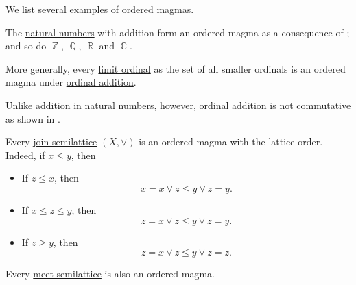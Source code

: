 \begin{example}\label{ex:def:ordered_magma}
  We list several examples of \hyperref[def:ordered_magma]{ordered magmas}.

  \begin{thmenum}
     The \hyperref[def:set_of_natural_numbers]{natural numbers} with addition form an ordered magma as a consequence of ; and so do \( \BbbZ \), \( \BbbQ \), \( \BbbR \) and \( \BbbC \).

     More generally, every \hyperref[def:successor_and_limit_ordinal]{limit ordinal} as the set of all smaller ordinals is an ordered magma under \hyperref[def:ordinal_arithmetic/addition]{ordinal addition}.

    Unlike addition in natural numbers, however, ordinal addition is not commutative as shown in .

     Every \hyperref[def:semilattice/join]{join-semilattice} \( (X, \vee) \) is an ordered magma with the lattice order. Indeed, if \( x \leq y \), then
    \begin{itemize}
      \item If \( z \leq x \), then
      \begin{equation*}
        x = x \vee z \leq y \vee z = y.
      \end{equation*}

      \item If \( x \leq z \leq y \), then
      \begin{equation*}
        z = x \vee z \leq y \vee z = y.
      \end{equation*}

      \item If \( z \geq y \), then
      \begin{equation*}
        z = x \vee z \leq y \vee z = z.
      \end{equation*}
    \end{itemize}

    Every \hyperref[def:semilattice/meet]{meet-semilattice} is also an ordered magma.
  \end{thmenum}
\end{example}

